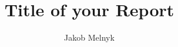 \documentclass[conference]{IEEEtran}
\begin{document}
\title{\ \\ \LARGE\bf Title of your Report}

\author{Jakob Melnyk}

\maketitle








\end{document}

